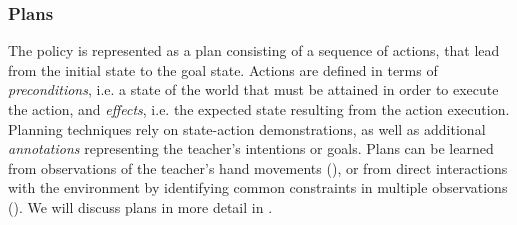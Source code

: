 \subsubsection{Plans}\label{sssec:Plans}
The policy is represented as a plan consisting of a sequence of actions, that lead from the initial state to the goal state.
Actions are defined in terms of \textit{preconditions}, i.e. a state of the world that must be attained in order to execute the action, and \textit{effects}, i.e. the expected state resulting from the action execution. 
Planning techniques rely on state-action demonstrations, as well as additional \textit{annotations} representing the teacher's intentions or goals.
Plans can be learned from observations of the teacher's hand movements (\cite{kuniyoshi1994learning}), or from direct interactions with the environment by identifying common constraints in multiple observations (\cite{ekvall2008robot}).
We will discuss plans in more detail in .


